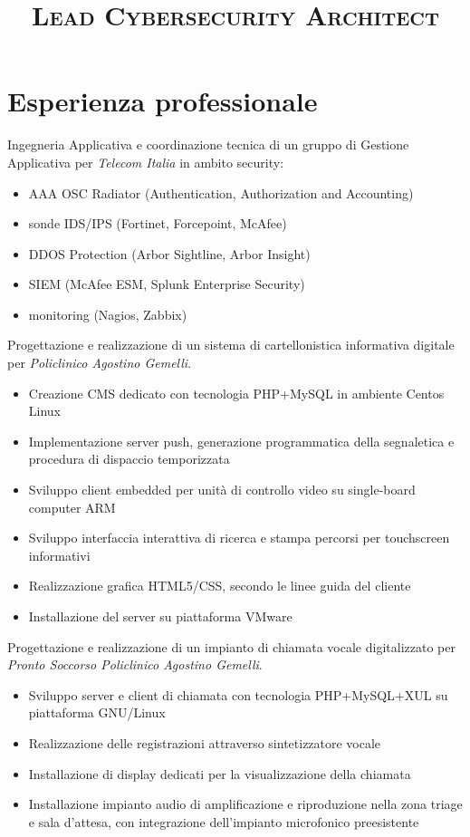 \documentclass[a4paper, 11pt]{moderncv}
\title{\Large{\textsc{Lead Cybersecurity \break Architect}}}
\begin{document}
\makecvtitle

\section{Esperienza professionale}
        {Ingegneria Applicativa e coordinazione tecnica di un gruppo di Gestione Applicativa per \emph{Telecom Italia} in ambito security:
\vspace{3mm}
          \begin{itemize}
          \item AAA OSC Radiator (Authentication, Authorization and Accounting)
          \item sonde IDS/IPS (Fortinet, Forcepoint, McAfee)
          \item DDOS Protection (Arbor Sightline, Arbor Insight)
          \item SIEM (McAfee ESM, Splunk Enterprise Security)
          \item monitoring (Nagios, Zabbix)
          \end{itemize}}
\vspace{3mm}
        {Progettazione e realizzazione di un sistema di cartellonistica informativa digitale per \emph{Policlinico Agostino Gemelli}.
          \begin{itemize}
          \item Creazione CMS dedicato con tecnologia PHP+MySQL in ambiente Centos Linux
          \item Implementazione server push, generazione programmatica della segnaletica e procedura di dispaccio temporizzata
          \item Sviluppo client embedded per unità di controllo video su single-board computer ARM
          \item Sviluppo interfaccia interattiva di ricerca e stampa percorsi per touchscreen informativi
          \item Realizzazione grafica HTML5/CSS, secondo le linee guida del cliente
          \item Installazione del server su piattaforma VMware
          \end{itemize}
        \vspace{10pt}
          Progettazione e realizzazione di un impianto di chiamata vocale digitalizzato per \emph{Pronto Soccorso Policlinico Agostino Gemelli}.
          \begin{itemize}
          \item Sviluppo server e client di chiamata con tecnologia PHP+MySQL+XUL su piattaforma GNU/Linux
          \item Realizzazione delle registrazioni attraverso sintetizzatore vocale
          \item Installazione di display dedicati per la visualizzazione della chiamata
          \item Installazione impianto audio di amplificazione e riproduzione nella zona triage e sala d'attesa, con integrazione dell'impianto microfonico preesistente
          \end{itemize}}
\end{document}
